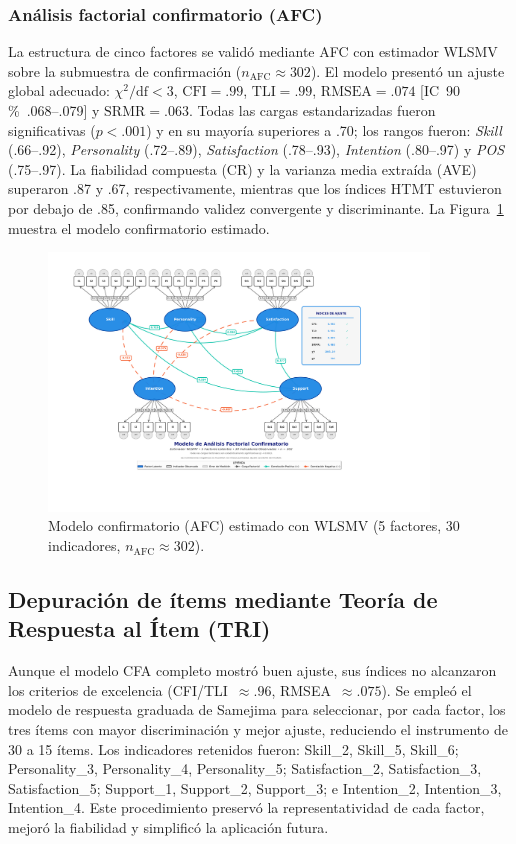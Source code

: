 \subsubsection*{Análisis factorial confirmatorio (AFC)}
La estructura de cinco factores se validó mediante AFC con estimador WLSMV sobre la submuestra de confirmación ($n_{\text{AFC}}\approx302$). El modelo presentó un ajuste global adecuado: $\chi^2/\mathrm{df} < 3$, $\mathrm{CFI}=.99$, $\mathrm{TLI}=.99$, $\mathrm{RMSEA}=.074$ [IC 90\,\% .068–.079] y $\mathrm{SRMR}=.063$. Todas las cargas estandarizadas fueron significativas ($p<.001$) y en su mayoría superiores a .70; los rangos fueron: \emph{Skill} (.66–.92), \emph{Personality} (.72–.89), \emph{Satisfaction} (.78–.93), \emph{Intention} (.80–.97) y \emph{POS} (.75–.97). La fiabilidad compuesta (CR) y la varianza media extraída (AVE) superaron .87 y .67, respectivamente, mientras que los índices HTMT estuvieron por debajo de .85, confirmando validez convergente y discriminante. La Figura \ref{fig:cfa} muestra el modelo confirmatorio estimado.

\begin{figure}[htbp]
\centering
\includegraphics[width=0.9\textwidth]{figures/Diagrama_CFA_WLSMV_Ajustado_Final.pdf}
\caption{Modelo confirmatorio (AFC) estimado con WLSMV (5 factores, 30 indicadores, $n_{\text{AFC}}\approx302$).}
\label{fig:cfa}
\end{figure}

\subsection{Depuración de ítems mediante Teoría de Respuesta al Ítem (TRI)}
Aunque el modelo CFA completo mostró buen ajuste, sus índices no alcanzaron los criterios de excelencia (CFI/TLI $\approx.96$, RMSEA $\approx.075$). Se empleó el modelo de respuesta graduada de Samejima para seleccionar, por cada factor, los tres ítems con mayor discriminación y mejor ajuste, reduciendo el instrumento de 30 a 15 ítems. Los indicadores retenidos fueron: Skill\_2, Skill\_5, Skill\_6; Personality\_3, Personality\_4, Personality\_5; Satisfaction\_2, Satisfaction\_3, Satisfaction\_5; Support\_1, Support\_2, Support\_3; e Intention\_2, Intention\_3, Intention\_4. Este procedimiento preservó la representatividad de cada factor, mejoró la fiabilidad y simplificó la aplicación futura.

